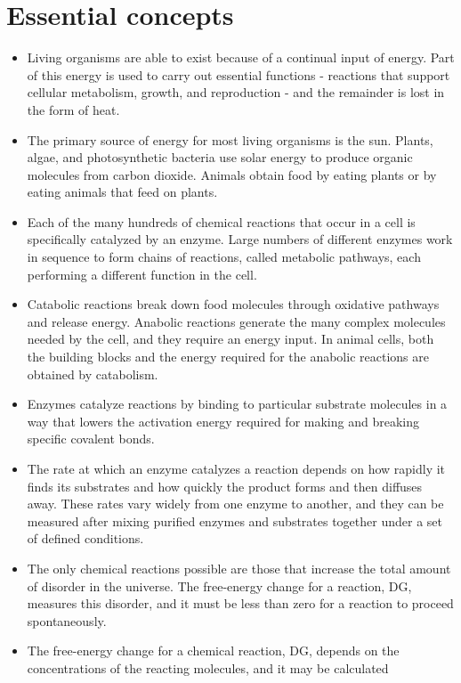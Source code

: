 \section{Essential concepts}

\begin{itemize}
\item Living organisms are able to exist because of a continual input
of energy. Part of this energy is used to carry out essential functions
- reactions that support cellular metabolism, growth, and
reproduction - and the remainder is lost in the form of heat.
\item The primary source of energy for most living organisms is the sun.
Plants, algae, and photosynthetic bacteria use solar energy to produce
organic molecules from carbon dioxide. Animals obtain food by
eating plants or by eating animals that feed on plants.
\item Each of the many hundreds of chemical reactions that occur in a cell
is specifically catalyzed by an enzyme. Large numbers of different
enzymes work in sequence to form chains of reactions, called metabolic
pathways, each performing a different function in the cell.
\item Catabolic reactions break down food molecules through oxidative
pathways and release energy. Anabolic reactions generate the
many complex molecules needed by the cell, and they require an
energy input. In animal cells, both the building blocks and the energy
required for the anabolic reactions are obtained by catabolism.
\item Enzymes catalyze reactions by binding to particular substrate molecules
in a way that lowers the activation energy required for making
and breaking specific covalent bonds.
\item The rate at which an enzyme catalyzes a reaction depends on how
rapidly it finds its substrates and how quickly the product forms and
then diffuses away. These rates vary widely from one enzyme to
another, and they can be measured after mixing purified enzymes
and substrates together under a set of defined conditions.
\item The only chemical reactions possible are those that increase the
total amount of disorder in the universe. The free-energy change for
a reaction, DG, measures this disorder, and it must be less than zero
for a reaction to proceed spontaneously.
\item The free-energy change for a chemical reaction, DG, depends on the
concentrations of the reacting molecules, and it may be calculated

\end{itemize}
